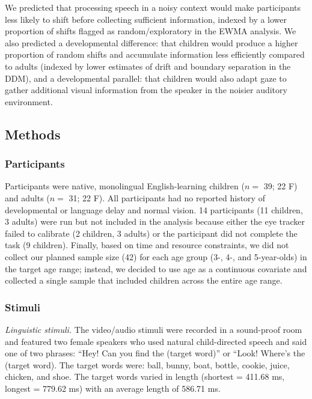 \documentclass[,man,floatsintext]{apa6}
\begin{document}
We predicted that processing speech in a noisy context would make
participants less likely to shift before collecting sufficient
information, indexed by a lower proportion of shifts flagged as
random/exploratory in the EWMA analysis. We also predicted a
developmental difference: that children would produce a higher
proportion of random shifts and accumulate information less efficiently
compared to adults (indexed by lower estimates of drift and boundary
separation in the DDM), and a developmental parallel: that children
would also adapt gaze to gather additional visual information from the
speaker in the noisier auditory environment.

\subsection{Methods}\label{methods-1}

\subsubsection{Participants}\label{participants-1}

Participants were native, monolingual English-learning children (\(n=\)
39; 22 F) and adults (\(n=\) 31; 22 F). All participants had no reported
history of developmental or language delay and normal vision. 14
participants (11 children, 3 adults) were run but not included in the
analysis because either the eye tracker failed to calibrate (2 children,
3 adults) or the participant did not complete the task (9 children).
Finally, based on time and resource constraints, we did not collect our
planned sample size (42) for each age group (3-, 4-, and 5-year-olds) in
the target age range; instead, we decided to use age as a continuous
covariate and collected a single sample that included children across
the entire age range.

\subsubsection{Stimuli}\label{stimuli-1}

\emph{Linguistic stimuli.} The video/audio stimuli were recorded in a
sound-proof room and featured two female speakers who used natural
child-directed speech and said one of two phrases: \enquote{Hey! Can you
find the (target word)} or ``Look! Where's the (target word). The target
words were: ball, bunny, boat, bottle, cookie, juice, chicken, and shoe.
The target words varied in length (shortest = 411.68 ms, longest =
779.62 ms) with an average length of 586.71 ms.
\end{document}
